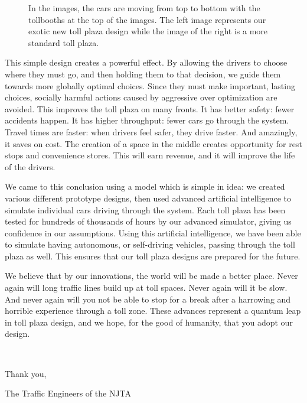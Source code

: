 \documentclass[a4paper, 11pt]{article}
\begin{document}
\begin{figure}[H]
\begin{center}
\begin{tabular}{c c}
\end{tabular}
\end{center}
\caption{In the images, the cars are moving from top to bottom with the tollbooths at the top of the images. The left image represents our exotic new toll plaza design while the image of the right is a more standard toll plaza.}
\label{two_types}
\end{figure}

This simple design creates a powerful effect. By allowing the drivers to choose where they must go, and then holding them to that decision, we guide them towards more globally optimal choices. Since they must make important, lasting choices, socially harmful actions caused by aggressive over optimization are avoided. This improves the toll plaza on many fronts. It has better safety: fewer accidents happen. It has higher throughput: fewer cars go through the system. Travel times are faster: when drivers feel safer, they drive faster. And amazingly, it saves on cost. The creation of a space in the middle creates opportunity for rest stops and convenience stores. This will earn revenue, and it will improve the life of the drivers. 

We came to this conclusion using a model which is simple in idea: we created various different prototype designs, then used advanced artificial intelligence to simulate individual cars driving through the system. Each toll plaza has been tested for hundreds of thousands of hours by our advanced simulator, giving us confidence in our assumptions. Using this artificial intelligence, we have been able to simulate having autonomous, or self-driving vehicles, passing through the toll plaza as well. This ensures that our toll plaza designs are prepared for the future. 

We believe that by our innovations, the world will be made a better place. Never again will long traffic lines build up at toll spaces. Never again will it be slow. And never again will you not be able to stop for a break after a harrowing and horrible experience through a toll zone. These advances represent a quantum leap in toll plaza design, and we hope, for the good of humanity, that you adopt our design.

\

Thank you, 

The Traffic Engineers of the NJTA

\newpage





\end{document}
